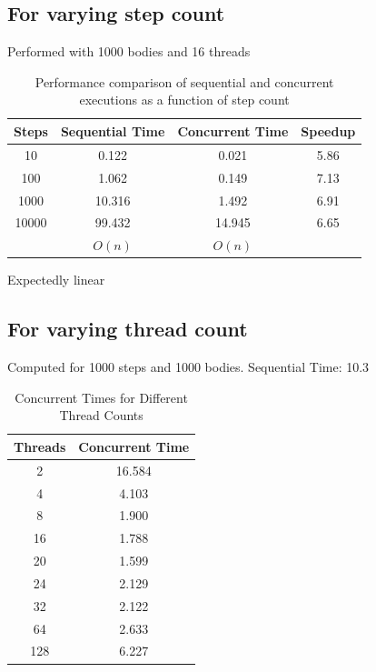 \documentclass{article}
\begin{document}
\subsection{For varying step count}
Performed with 1000 bodies and 16 threads
\begin{table}[h]
  \centering
  \begin{tabular}{|c|c|c|c|}
    \hline
    Steps & Sequential Time & Concurrent Time & Speedup \\ \hline
    10 & 0.122 & 0.021 & 5.86 \\ \hline
    100 & 1.062 & 0.149 & 7.13 \\ \hline
    1000 & 10.316 & 1.492 & 6.91 \\ \hline
    10000 & 99.432 & 14.945 & 6.65 \\ \hline
    & $O(n)$ & $O(n)$ & \\ \hline
  \end{tabular}
  \caption{Performance comparison of sequential and concurrent executions as a function of step count}
  \label{tab:performance_comparison}
\end{table}

		
Expectedly linear				

\subsection{For varying thread count}
Computed for 1000 steps and 1000 bodies.
Sequential Time: 10.3

\begin{table}[h]
  \centering
  \begin{tabular}{|c|c|}
    \hline
    Threads & Concurrent Time \\ \hline
    2  & 16.584 \\ \hline
    4  & 4.103 \\ \hline
    8  & 1.900 \\ \hline
    16 & 1.788 \\ \hline
    20 & 1.599 \\ \hline
    24 & 2.129 \\ \hline
    32 & 2.122 \\ \hline
    64 & 2.633 \\ \hline
    128 & 6.227 \\ \hline
  \end{tabular}
  \caption{Concurrent Times for Different Thread Counts}
  \label{tab:concurrent_times}
\end{table}
	
\end{document}
